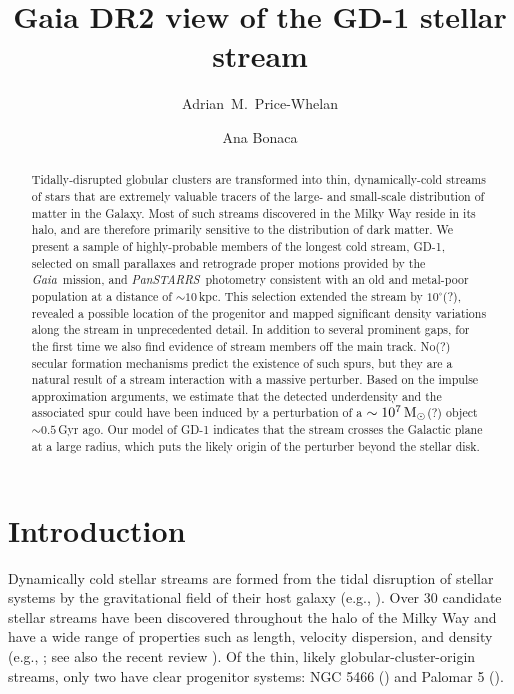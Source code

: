 \documentclass[modern]{aastex62}
\newcommand{\gaia}{\textsl{Gaia}}
\newcommand{\pans}{\textsl{PanSTARRS}}
\begin{document}
\sloppy\sloppypar\raggedbottom\frenchspacing %

\title{Gaia DR2 view of the GD-1 stellar stream}

\author[0000-0003-0872-7098]{Adrian~M.~Price-Whelan}

\author[0000-0002-7846-9787]{Ana Bonaca}


\begin{abstract}\noindent %
Tidally-disrupted globular clusters are transformed into thin, dynamically-cold streams
of stars that are extremely valuable tracers of the large- and small-scale
distribution of matter in the Galaxy.
Most of such streams discovered in the Milky Way reside in its halo, and are therefore primarily sensitive to the distribution of dark matter.
We present a sample of highly-probable members of the longest cold stream, GD-1, selected on small parallaxes and retrograde proper motions provided by the \gaia\ mission, and \pans\ photometry consistent with an old and metal-poor population at a distance of $\sim10\,$kpc.
This selection extended the stream by $10^\circ$(?), revealed a possible location of the progenitor and mapped significant density variations along the stream in unprecedented detail.
In addition to several prominent gaps, for the first time we also find evidence of stream members off the main track.
No(?) secular formation mechanisms predict the existence of such spurs, but they are a natural result of a stream interaction with a massive perturber.
Based on the impulse approximation arguments, we estimate that the detected underdensity and the associated spur could have been induced by a perturbation of a $\sim10^7\,\rm M_\odot$(?) object $\sim 0.5\,$Gyr ago.
Our model of GD-1 indicates that the stream crosses the Galactic plane at a large radius, which puts the likely origin of the perturber beyond the stellar disk.
\end{abstract}


\section{Introduction}
\label{sec:intro}

Dynamically cold stellar streams are formed from the tidal disruption of stellar
systems by the gravitational field of their host galaxy (e.g.,
\citealt{Johnston:1998}).
Over 30 candidate stellar streams have been discovered throughout the halo of
the Milky Way and have a wide range of properties such as length, velocity
dispersion, and density (e.g., \citealt{SoManyPeople,Bonaca:2012}; see also the
recent review \citealt{Grillmair:2006, Newberg:2016}).
Of the thin, likely globular-cluster-origin streams, only two have clear
progenitor systems: NGC 5466 (\citealt{TODO}) and Palomar 5 (\citealt{TODO}).
\end{document}
